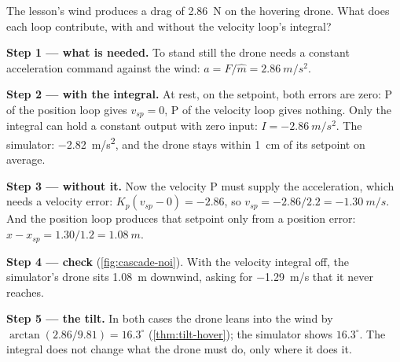 \begin{example}
\label{ex:cascade-wind}
The lesson's wind produces a drag of \SI{2.86}{N} on the hovering drone. What does each loop contribute, with and without the velocity loop's integral?

\textbf{Step 1 — what is needed.} To stand still the drone needs a constant acceleration command against the wind: $a = F/\hat m = \SI{2.86}{m/s^2}$.

\textbf{Step 2 — with the integral.} At rest, on the setpoint, both errors are zero: P of the position loop gives $v_{sp} = 0$, P of the velocity loop gives nothing. Only the integral can hold a constant output with zero input: $I = \SI{-2.86}{m/s^2}$. The simulator: \SI{-2.82}{m/s^2}, and the drone stays within \SI{1}{cm} of its setpoint on average.

\textbf{Step 3 — without it.} Now the velocity P must supply the acceleration, which needs a velocity error: $K_p(v_{sp} - 0) = -2.86$, so $v_{sp} = -2.86/2.2 = \SI{-1.30}{m/s}$. And the position loop produces that setpoint only from a position error: $x - x_{sp} = 1.30/1.2 = \SI{1.08}{m}$.

\textbf{Step 4 — check} (\cref{fig:cascade-noi}). With the velocity integral off, the simulator's drone sits \SI{1.08}{m} downwind, asking for \SI{-1.29}{m/s} that it never reaches.

\textbf{Step 5 — the tilt.} In both cases the drone leans into the wind by $\arctan(2.86/9.81) = 16.3^\circ$ (\cref{thm:tilt-hover}); the simulator shows $16.3^\circ$. The integral does not change what the drone must do, only where it does it.
\end{example}


